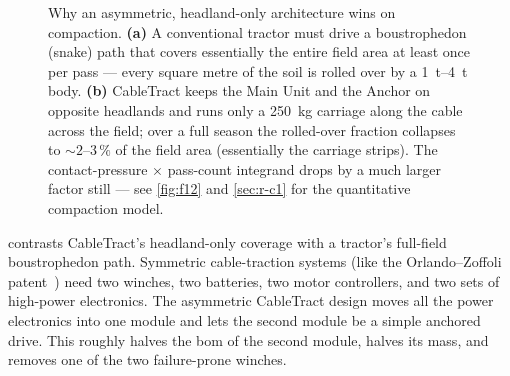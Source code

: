 \documentclass[11pt,a4paper]{article}
\begin{document}
\begin{figure}[H]
\caption{Why an asymmetric, headland-only architecture wins on compaction. \textbf{(a)} A conventional tractor must drive a boustrophedon (snake) path that covers essentially the entire field area at least once per pass --- every square metre of the soil is rolled over by a \SIrange{1}{4}{\tonne} body. \textbf{(b)} CableTract keeps the Main Unit and the Anchor on opposite headlands and runs only a \SI{250}{\kilogram} carriage along the cable across the field; over a full season the rolled-over fraction collapses to ${\sim}2\text{--}3\,\%$ of the field area (essentially the carriage strips). The contact-pressure $\times$ pass-count integrand drops by a much larger factor still --- see \cref{fig:f12} and \cref{sec:r-c1} for the quantitative compaction model.}
\label{fig:f0d}
\end{figure}

 contrasts CableTract's headland-only coverage with a tractor's full-field boustrophedon path. Symmetric cable-traction systems (like the Orlando--Zoffoli patent~\cite{orlando2014patent}) need two winches, two batteries, two motor controllers, and two sets of high-power electronics. The asymmetric CableTract design moves all the power electronics into one module and lets the second module be a simple anchored drive. This roughly halves the \gls{bom} of the second module, halves its mass, and removes one of the two failure-prone winches.
\end{document}
